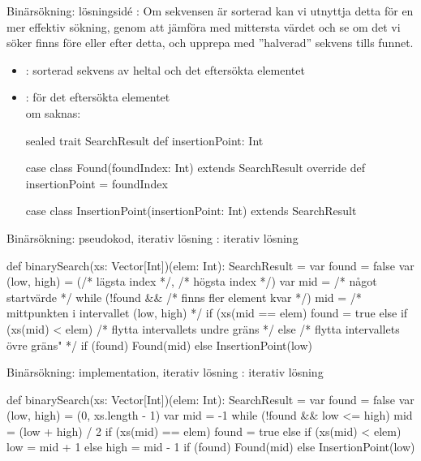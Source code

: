\begin{Slide}{Binärsökning: lösningsidé}
: Om sekvensen är sorterad kan vi utnyttja detta för en mer effektiv sökning, genom att jämföra med mittersta värdet och se om det vi söker finns före eller efter detta, och upprepa med ''halverad'' sekvens tills funnet.
\pause
\begin{itemize}\SlideFontSmall
\item {}: sorterad sekvens av heltal och det eftersökta elementet
\item {}:  för det eftersökta elementet
\\ om saknas: 
\pause
\begin{Code}
sealed trait SearchResult {
  def insertionPoint: Int
}

case class Found(foundIndex: Int) extends SearchResult {
  override def insertionPoint = foundIndex
}
  
case class InsertionPoint(insertionPoint: Int) extends SearchResult
\end{Code}
\end{itemize} 
\end{Slide}

\begin{Slide}{Binärsökning: pseudokod, iterativ lösning}
: iterativ lösning
\begin{Code}
def binarySearch(xs: Vector[Int])(elem: Int): SearchResult = {
  var found = false
  var (low, high) = (/* lägsta index */, /* högsta index */)
  var mid = /* något startvärde */ 
  while (!found && /* finns fler element kvar */) {
    mid = /* mittpunkten i intervallet (low, high) */
    if (xs(mid == elem) found = true
    else if (xs(mid) < elem) /* flytta intervallets undre gräns */
    else /* flytta intervallets övre gräns" */
  }
  if (found) Found(mid)
  else InsertionPoint(low)
}
\end{Code}
\end{Slide}



\begin{Slide}{Binärsökning: implementation, iterativ lösning}
: iterativ lösning
\begin{Code}
def binarySearch(xs: Vector[Int])(elem: Int): SearchResult = {
  var found = false
  var (low, high) = (0, xs.length - 1)
  var mid = -1 
  while (!found && low <= high) {
    mid = (low + high) / 2
    if (xs(mid) == elem) found = true
    else if (xs(mid) < elem) low = mid + 1
    else high = mid - 1 
  }
  if (found) Found(mid) 
  else InsertionPoint(low)
}
\end{Code}
\end{Slide}

